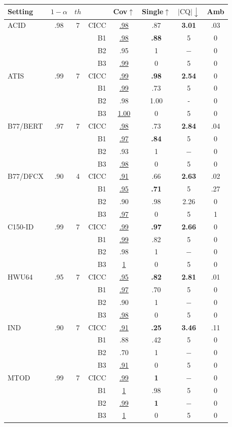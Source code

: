 \begin{table}[tp]
\centering
\footnotesize{
\setlength\tabcolsep{2pt}
\begin{tabular}{lccr|cccc}
\toprule
Setting & $1-\alpha$ & $th$ &    & Cov$\uparrow$ & Single$\uparrow$ & $|\text{CQ}|\downarrow$ & Amb \\ \midrule
ACID  & .98 & 7 &  CICC & \underline{.98} & .87 & \textbf{3.01} & .03 \\
& & &  B1 & \underline{.98} & \textbf{.88} & 5 & 0 \\
& & &  B2 & .95 & 1 & $-$ & 0 \\
& & &  B3 & \underline{.99} & 0 & 5 & 0 \\
\midrule
ATIS & .99 & 7  &  CICC & \underline{.99} & \textbf{.98} & \textbf{2.54} & 0 \\
& & &  B1 & \underline{.99} & .73 & 5 & 0 \\
& & &  B2 & .98 & 1.00 & - & 0 \\
& & &  B3 & \underline{1.00} & 0 & 5 & 0 \\
\midrule
B77/BERT & .97 & 7 &  CICC & \underline{.98} & .73 & \textbf{2.84} & .04 \\
& & &  B1 & \underline{.97} & \textbf{.84} & 5 & 0 \\
& & &  B2 & .93 & 1 & $-$ & 0 \\
& & &  B3 & \underline{.98} & 0 & 5 & 0 \\
\midrule
B77/DFCX  & .90& 4 &  CICC & \underline{.91} & .66 & \textbf{2.63} & .02 \\
&& &  B1 & \underline{.95} & \textbf{.71} & 5 & .27 \\
&& &  B2 & .90 & .98 & 2.26 & 0 \\
&& &  B3 & \underline{.97} & 0 & 5 & 1 \\
\midrule
C150-ID  & .99 & 7 &  CICC & \underline{.99} & \textbf{.97} & \textbf{2.66} & 0 \\
& & &  B1 & \underline{.99} & .82 & 5 & 0 \\
& & &  B2 & .98 & 1 & $-$ & 0 \\
& & &  B3 & \underline{1} & 0 & 5 & 0 \\
\midrule
HWU64 & .95 & 7 &  CICC & \underline{.95} & \textbf{.82} & \textbf{2.81} & .01 \\
& & &  B1 & \underline{.97} & .70 & 5 & 0 \\
& & &  B2 & .90 & 1 & $-$ & 0 \\
& & &  B3 & \underline{.98} & 0 & 5 & 0 \\
\midrule
IND  & .90 & 7 &  CICC & \underline{.91} & \textbf{.25} & \textbf{3.46} & .11 \\
& & &  B1 & .88 & .42 & 5 & 0 \\
& & &  B2 & .70 & 1 & $-$ & 0 \\
& & &  B3 & \underline{.91} & 0 & 5 & 0 \\
\midrule
MTOD  & .99 & 7  &  CICC & \underline{.99} & \textbf{1} & $-$ & 0 \\
& & &  B1 & \underline{1} & .98 & 5 & 0 \\
& & &  B2 & \underline{.99} & \textbf{1} & $-$ & 0 \\
& & &  B3 & \underline{1} & 0 & 5 & 0 \\
 

\end{tabular}}
\end{table}

